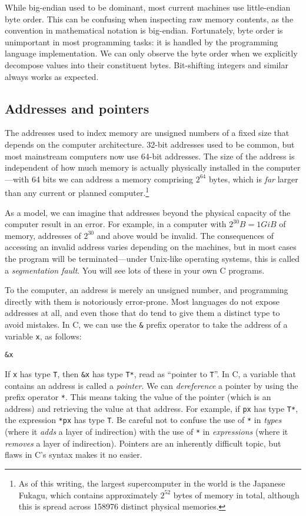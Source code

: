 While big-endian used to be dominant, most current machines use
little-endian byte order.  This can be confusing when inspecting raw
memory contents, as the convention in mathematical notation is
big-endian.  Fortunately, byte order is unimportant in most
programming tasks: it is handled by the programming language
implementation.  We can only observe the byte order when we explicitly
decompose values into their constituent bytes.  Bit-shifting integers
and similar always works as expected.

\subsection{Addresses and pointers}

The addresses used to index memory are unsigned numbers of a fixed
size that depends on the computer architecture.  32-bit addresses used
to be common, but most mainstream computers now use 64-bit addresses.
The size of the address is independent of how much memory is actually
physically installed in the computer---with 64 bits we can address a
memory comprising $2^{64}$ bytes, which is \emph{far} larger than any
current or planned computer.\footnote{As of this writing, the largest
  supercomputer in the world is the Japanese Fukagu, which contains
  approximately $2^{52}$ bytes of memory in total, although this is
  spread across 158976 distinct physical memories.}

As a model, we can imagine that addresses beyond the physical capacity
of the computer result in an error.  For example, in a computer with
$2^{30}B=1GiB$ of memory, addresses of $2^{30}$ and above would be
invalid.  The consequences of accessing an invalid address varies
depending on the machines, but in most cases the program will be
terminated---under Unix-like operating systems, this is called a
\emph{segmentation fault}.  You will see lots of these in your own C
programs.

To the computer, an address is merely an unsigned number, and
programming directly with them is notoriously error-prone.  Most
languages do not expose addresses at all, and even those that do tend
to give them a distinct type to avoid mistakes.  In C, we can use the
\texttt{\&} prefix operator to take the address of a variable
\texttt{x}, as follows:
\begin{center}
  \texttt{\&x}
\end{center}
If \texttt{x} has type \texttt{T}, then \texttt{\&x} has type
\texttt{T*}, read as ``pointer to \texttt{T}''.  In C, a variable that
contains an address is called a \emph{pointer}.  We can
\emph{dereference} a pointer by using the prefix operator \texttt{*}.
This means taking the value of the pointer (which is an address) and
retrieving the value at that address.  For example, if \texttt{px} has
type \texttt{T*}, the expression \texttt{*px} has type \texttt{T}.  Be
careful not to confuse the use of \texttt{*} in \emph{types} (where it
\emph{adds} a layer of indirection) with the use of \texttt{*} in
\emph{expressions} (where it \emph{removes} a layer of indirection).
Pointers are an inherently difficult topic, but flaws in C's syntax
makes it no easier.

